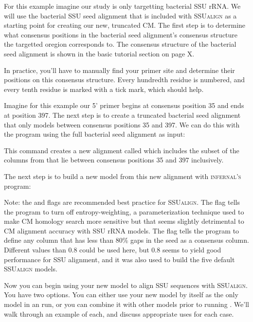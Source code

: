 For this example imagine our study is only targetting bacterial SSU
rRNA. We will use the bacterial SSU seed alignment that is included
with \textsc{SSUalign} as a starting point for creating our new,
truncated CM. The first step is to determine what consensus positions
in the bacterial seed alignment's consensus structure the targetted
oregion corresponds to. The consensus structure of the bacterial seed
alignment is shown in the basic tutorial section on page X.

In practice, you'll have to manually find your primer site and
determine their positions on this consensus structure. Every hundredth
residue is numbered, and every tenth residue is marked with a tick
mark, which should help. 

Imagine for this example our 5' primer begins at consensus position
35 and ends at position 397. The next step is to create a truncated
bacterial seed alignment that only models between consensus positions
35 and 397. We can do this with the  program using
the full bacterial seed alignment as input:


This command creates a new alignment called  which
includes the subset of the columns from  that lie
between consensus positions 35 and 397 inclusively.

The next step is to build a new model from this new alignment with
\textsc{infernal's}  program: 


Note: the  and  flags are
recommended best practice for \textsc{SSUalign}. The 
flag tells the program to turn off entropy-weighting, a
parameterization technique used to make CM homology search more
sensitive \cite{Nawrocki07} but that seems slightly detrimental to CM
alignment accuracy with SSU rRNA models. The 
flag tells the program to define any column that has less than 80\%
gaps in the seed as a consensus column. Different values than 0.8
could be used here, but 0.8 seems to yield good performance for SSU
alignment, and it was also used to build the five default
\textsc{SSUalign} models.

Now you can begin using your new model  to align
SSU sequences with \textsc{SSUalign}. You have two options. 
You can either use your new model by itself as the only model in an
 run, or you can combine it with other models prior to
running . We'll walk through an example of each, and
discuss appropriate uses for each case.

